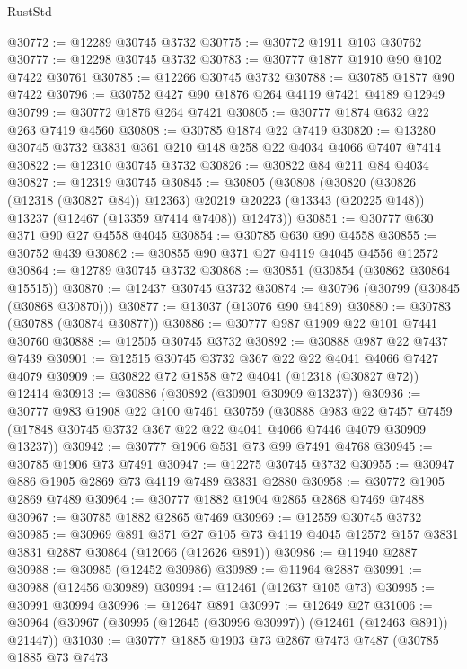 \begin{lexlean}{RustStd}
\begin{coremodule}
@30772 := @12289 @30745 @3732
@30775 := @30772 @1911 @103 @30762
@30777 := @12298 @30745 @3732
@30783 := @30777 @1877 @1910 @90 @102 @7422 @30761
@30785 := @12266 @30745 @3732
@30788 := @30785 @1877 @90 @7422
@30796 := @30752 @427 @90 @1876 @264 @4119 @7421 @4189 @12949
@30799 := @30772 @1876 @264 @7421
@30805 := @30777 @1874 @632 @22 @263 @7419 @4560
@30808 := @30785 @1874 @22 @7419
@30820 := @13280 @30745 @3732 @3831 @361 @210 @148 @258 @22 @4034 @4066 @7407 @7414
@30822 := @12310 @30745 @3732
@30826 := @30822 @84 @211 @84 @4034
@30827 := @12319 @30745
@30845 := @30805
    (@30808
      (@30820
        (@30826 (@12318 (@30827 @84)) @12363)
        @20219
        @20223
        (@13343 (@20225 @148))
        @13237
        (@12467 (@13359 @7414 @7408))
        @12473))
@30851 := @30777 @630 @371 @90 @27 @4558 @4045
@30854 := @30785 @630 @90 @4558
@30855 := @30752 @439
@30862 := @30855 @90 @371 @27 @4119 @4045 @4556 @12572
@30864 := @12789 @30745 @3732
@30868 := @30851 (@30854 (@30862 @30864 @15515))
@30870 := @12437 @30745 @3732
@30874 := @30796 (@30799 (@30845 (@30868 @30870)))
@30877 := @13037 (@13076 @90 @4189)
@30880 := @30783 (@30788 (@30874 @30877))
@30886 := @30777 @987 @1909 @22 @101 @7441 @30760
@30888 := @12505 @30745 @3732
@30892 := @30888 @987 @22 @7437 @7439
@30901 := @12515 @30745 @3732 @367 @22 @22 @4041 @4066 @7427 @4079
@30909 := @30822 @72 @1858 @72 @4041 (@12318 (@30827 @72)) @12414
@30913 := @30886 (@30892 (@30901 @30909 @13237))
@30936 := @30777
    @983
    @1908
    @22
    @100
    @7461
    @30759
    (@30888
      @983
      @22
      @7457
      @7459
      (@17848 @30745 @3732 @367 @22 @22 @4041 @4066 @7446 @4079 @30909 @13237))
@30942 := @30777 @1906 @531 @73 @99 @7491 @4768
@30945 := @30785 @1906 @73 @7491
@30947 := @12275 @30745 @3732
@30955 := @30947 @886 @1905 @2869 @73 @4119 @7489 @3831 @2880
@30958 := @30772 @1905 @2869 @7489
@30964 := @30777 @1882 @1904 @2865 @2868 @7469 @7488
@30967 := @30785 @1882 @2865 @7469
@30969 := @12559 @30745 @3732
@30985 := @30969
    @891
    @371
    @27
    @105
    @73
    @4119
    @4045
    @12572
    @157
    @3831
    @3831
    @2887
    @30864
    (@12066 (@12626 @891))
@30986 := @11940 @2887
@30988 := @30985 (@12452 @30986)
@30989 := @11964 @2887
@30991 := @30988 (@12456 @30989)
@30994 := @12461 (@12637 @105 @73)
@30995 := @30991 @30994
@30996 := @12647 @891
@30997 := @12649 @27
@31006 := @30964 (@30967 (@30995 (@12645 (@30996 @30997)) (@12461 (@12463 @891)) @21447))
@31030 := @30777
    @1885
    @1903
    @73
    @2867
    @7473
    @7487
    (@30785
      @1885
      @73
      @7473

\end{coremodule}
\end{lexlean}
